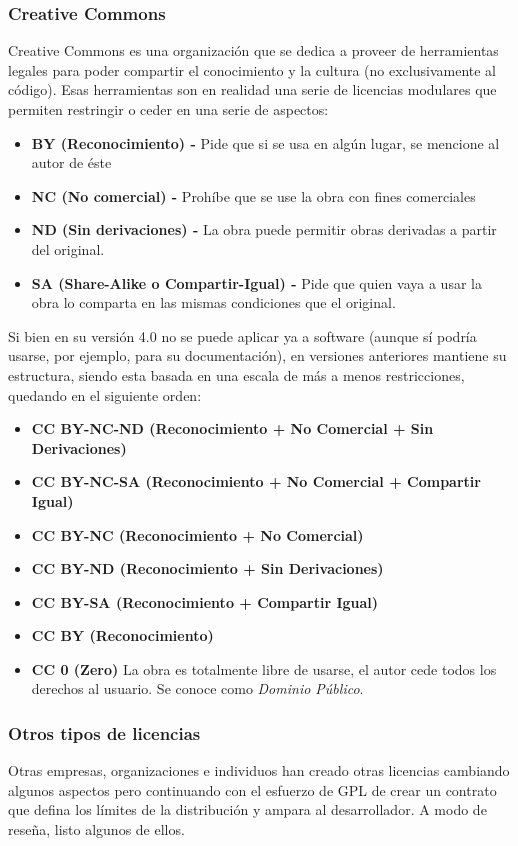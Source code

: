 \subsubsection{Creative Commons}
Creative Commons es una organización que se dedica a proveer de herramientas legales para poder compartir el conocimiento y la cultura (no exclusivamente al código). Esas herramientas son en realidad una serie de licencias modulares que permiten restringir o ceder en una serie de aspectos:

\begin{itemize}
	\item \textbf{BY (Reconocimiento) - } Pide que si se usa en algún lugar, se mencione al autor de éste
	\item \textbf{NC (No comercial) - } Prohíbe que se use la obra con fines comerciales
	\item \textbf{ND (Sin derivaciones) - } La obra puede permitir obras derivadas a partir del original.
	\item \textbf{SA (Share-Alike o Compartir-Igual) - } Pide que quien vaya a usar la obra lo comparta en las mismas condiciones que el original.
\end{itemize}

Si bien en su versión 4.0 no se puede aplicar ya a software (aunque sí podría usarse, por ejemplo, para su documentación), en versiones anteriores mantiene su estructura, siendo esta basada en una escala de más a menos restricciones, quedando en el siguiente orden:

\begin{itemize}
	\item \textbf{CC BY-NC-ND (Reconocimiento + No Comercial + Sin Derivaciones)}
	\item \textbf{CC BY-NC-SA (Reconocimiento + No Comercial + Compartir Igual)}
	\item \textbf{CC BY-NC (Reconocimiento + No Comercial)}
	\item \textbf{CC BY-ND (Reconocimiento + Sin Derivaciones)}
	\item \textbf{CC BY-SA (Reconocimiento + Compartir Igual)}
	\item \textbf{CC BY (Reconocimiento)}
	\item \textbf{CC 0 (Zero)} La obra es totalmente libre de usarse, el autor cede todos los derechos al usuario. Se conoce como \textit{Dominio Público}.
\end{itemize}

\subsubsection{Otros tipos de licencias}
Otras empresas, organizaciones e individuos han creado otras licencias cambiando algunos aspectos pero continuando con el esfuerzo de GPL de crear un contrato que defina los límites de la distribución y ampara al desarrollador. A modo de reseña, listo algunos de ellos.


